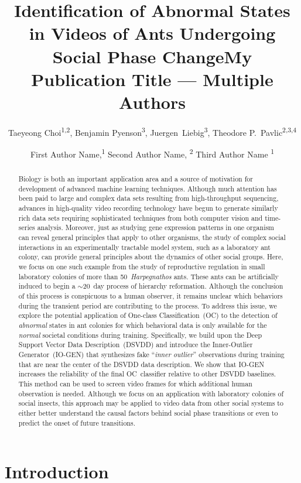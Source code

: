 \documentclass[letterpaper]{article} %
\title{Identification of Abnormal States in Videos of Ants Undergoing Social Phase Change}
\author{
    Taeyeong Choi\textsuperscript{\rm 1,2},
    Benjamin Pyenson\textsuperscript{\rm 3},
    Juergen~Liebig\textsuperscript{\rm 3},
	Theodore P.~Pavlic\textsuperscript{\rm 2,3,4} \\
}
\title{My Publication Title --- Multiple Authors}
\author {

        First Author Name,\textsuperscript{\rm 1}
        Second Author Name, \textsuperscript{\rm 2}
        Third Author Name \textsuperscript{\rm 1} \\
}
\begin{document}
\maketitle

\begin{abstract}
Biology is both an important application area and a source of motivation
for development of advanced machine learning techniques. Although
much attention has been paid to large and complex data sets
resulting from high-throughput sequencing, advances in
high-quality video recording technology have begun to generate
similarly rich data sets requiring sophisticated techniques from both
computer vision and time-series analysis. Moreover, just as studying
gene expression patterns in one organism can reveal general principles
that apply to other organisms, the study of complex social
interactions in an experimentally tractable model system, such as a
laboratory ant colony, can provide general principles about the dynamics
of other social groups. Here, we focus on one such example
from the study of reproductive regulation in small laboratory colonies
of more than 50~\emph{Harpegnathos} ants. These ants can be
artificially induced to begin a $\sim$20~day process of hierarchy
reformation. Although the conclusion of this process is conspicuous to a
human observer, it remains unclear which behaviors during the
transient period are contributing to the process. To address this issue, we
explore the potential application of One-class Classification~(OC) to
the detection of \emph{abnormal} states in ant colonies for which
behavioral data is only available for the \emph{normal} societal
conditions during training. Specifically, we build upon the Deep Support
Vector Data Description~(DSVDD) and introduce the Inner-Outlier
Generator~(\mbox{IO-GEN}) that synthesizes fake ``\emph{inner outlier}''
observations during training that are near the center of the DSVDD data
description. We show that \mbox{IO-GEN} increases the reliability of the final
OC~classifier relative to other DSVDD baselines. This method can be used
to screen video frames for which additional human observation is needed.
Although we focus on an application with laboratory colonies of social
insects, this approach may be applied to video data from other social
systems to either better understand the causal factors behind social
phase transitions or even to predict the onset of future transitions.
\end{abstract}

\section{Introduction}
\label{sec:intro}
\end{document}
